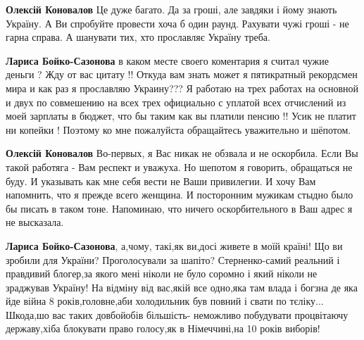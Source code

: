 \begin{itemize}
\begin{itemize}
\begin{itemize}
\textbf{Олексій Коновалов} Це дуже багато. Да за гроші, але завдяки і йому знають Україну. А Ви спробуйте провести хоча б один раунд. Рахувати чужі гроші - не гарна справа. А шанувати тих, хто прославляє Україну треба.

\textbf{Лариса Бойко-Сазонова} в каком месте своего коментария я считал чужие деньги ? Жду от вас цитату !! Откуда вам знать может я пятикратный рекордсмен мира и как раз я прославляю Украину??? Я работаю на трех работах на основной и двух по совмешению на всех трех официально с уплатой всех отчислений из моей зарплаты в бюджет, что бы таким как вы платили пенсию !! Усик не платит ни копейки ! Поэтому ко мне пожалуйста обращайтесь уважительно и шёпотом.

\textbf{Олексій Коновалов} Во-первых, я Вас никак не обзвала и не оскорбила. Если Вы такой работяга - Вам респект и уважуха. Но шепотом я говорить, обращаться не буду. И указывать как мне себя вести не Ваши привилегии. И хочу Вам напомнить, что я прежде всего женщина. И посторонним мужикам стыдно было бы писать в таком тоне. Напоминаю, что ничего оскорбительного в Ваш адрес я не высказала.
\end{itemize} %


\obeycr
\textbf{Лариса Бойко-Сазонова}, а,чому, такі,як ви,досі живете в моїй країні!
Що ви зробили для України?
Проголосували за шапіто?
Стерненко-самий реальний і правдивий блогер,за якого мені ніколи не було соромно і який ніколи не зраджував Україну!
На відміну від вас,якій все одно,яка там влада і богзна де яка йде війна 8 років,головне,аби холодильник був повний і свати по тєліку...
Шкода,шо вас таких довбойобів більшість- неможливо побудувати процвітаючу державу,хіба блокувати право голосу,як в Німеччині,на 10 років виборів!
\restorecr

\end{itemize} %

\end{itemize} %
